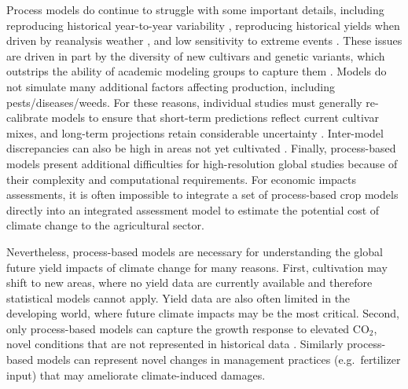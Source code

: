 \documentclass[preprint, 5p, times, twocolumn]{elsarticle}
\begin{document}
Process models do continue to struggle with some important details, including reproducing historical year-to-year variability \citep[e.g.][]{muller_global_2017}, reproducing historical yields when driven by reanalysis weather \citep[e.g.][]{Glotter14}, and low sensitivity to extreme events \citep[e.g.][]{Glotter15}. These issues are driven in part by the diversity of new cultivars and genetic variants, which outstrips the ability of academic modeling groups to capture them \citep[e.g.][]{JONES2017b}. Models do not simulate many additional factors affecting production, including pests/diseases/weeds. For these reasons, individual studies must generally re-calibrate models to ensure that short-term predictions reflect current cultivar mixes, and long-term projections retain considerable uncertainty \citep{WOLF2002217, JAGTAP200273, Iizumi2010, ANGULO201332, Asseng2013, Asseng2015}. Inter-model discrepancies can also be high in areas not yet cultivated \citep[e.g.][]{Challinor2014, WHITE2011357}. Finally, process-based models present additional difficulties for high-resolution global studies because of their complexity and computational requirements. For economic impacts assessments, it is often impossible to integrate a set of process-based crop models directly into an integrated assessment model to estimate the potential cost of climate change to the agricultural sector.

Nevertheless, process-based models are necessary for understanding the global future yield impacts of climate change for many reasons. First, cultivation may shift to new areas, where no yield data are currently available and therefore statistical models cannot apply. Yield data are also often limited in the developing world, where future climate impacts may be the most critical.  Second, only process-based models can capture the growth response to elevated CO$_2$, novel conditions that are not represented in historical data \citep[e.g.][]{pugh_climate_2016, Roberts2017}. Similarly process-based models can represent novel changes in management practices (e.g.\ fertilizer input) that may ameliorate climate-induced damages.
\end{document}
